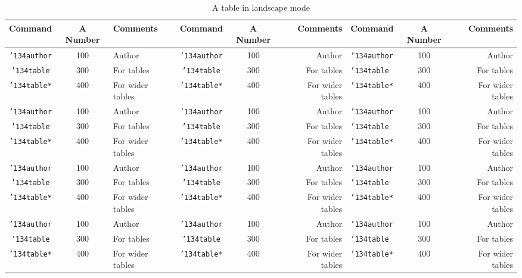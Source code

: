 \begin{landscape}
	\begin{table}[h]
		\caption{A table in landscape mode}
		\label{tab:landscape}
		\begin{tabular}{cclccrlcr}
			\toprule
			Command                    & A Number & Comments         & Command                    & A Number & Comments         & Command                    & A Number & Comments         \\
			\midrule
			\texttt{{\char'134}author} & 100      & Author           & \texttt{{\char'134}author} & 100      & Author           & \texttt{{\char'134}author} & 100      & Author           \\
			\texttt{{\char'134}table}  & 300      & For tables       & \texttt{{\char'134}table}  & 300      & For tables       & \texttt{{\char'134}table}  & 300      & For tables       \\
			\texttt{{\char'134}table*} & 400      & For wider tables & \texttt{{\char'134}table*} & 400      & For wider tables & \texttt{{\char'134}table*} & 400      & For wider tables \\
			\texttt{{\char'134}author} & 100      & Author           & \texttt{{\char'134}author} & 100      & Author           & \texttt{{\char'134}author} & 100      & Author           \\
			\texttt{{\char'134}table}  & 300      & For tables       & \texttt{{\char'134}table}  & 300      & For tables       & \texttt{{\char'134}table}  & 300      & For tables       \\
			\texttt{{\char'134}table*} & 400      & For wider tables & \texttt{{\char'134}table*} & 400      & For wider tables & \texttt{{\char'134}table*} & 400      & For wider tables \\
			\texttt{{\char'134}author} & 100      & Author           & \texttt{{\char'134}author} & 100      & Author           & \texttt{{\char'134}author} & 100      & Author           \\
			\texttt{{\char'134}table}  & 300      & For tables       & \texttt{{\char'134}table}  & 300      & For tables       & \texttt{{\char'134}table}  & 300      & For tables       \\
			\texttt{{\char'134}table*} & 400      & For wider tables & \texttt{{\char'134}table*} & 400      & For wider tables & \texttt{{\char'134}table*} & 400      & For wider tables \\
			\texttt{{\char'134}author} & 100      & Author           & \texttt{{\char'134}author} & 100      & Author           & \texttt{{\char'134}author} & 100      & Author           \\
			\texttt{{\char'134}table}  & 300      & For tables       & \texttt{{\char'134}table}  & 300      & For tables       & \texttt{{\char'134}table}  & 300      & For tables       \\
			\texttt{{\char'134}table*} & 400      & For wider tables & \texttt{{\char'134}table*} & 400      & For wider tables & \texttt{{\char'134}table*} & 400      & For wider tables \\
			\bottomrule
		\end{tabular}
	\end{table}
\end{landscape}


